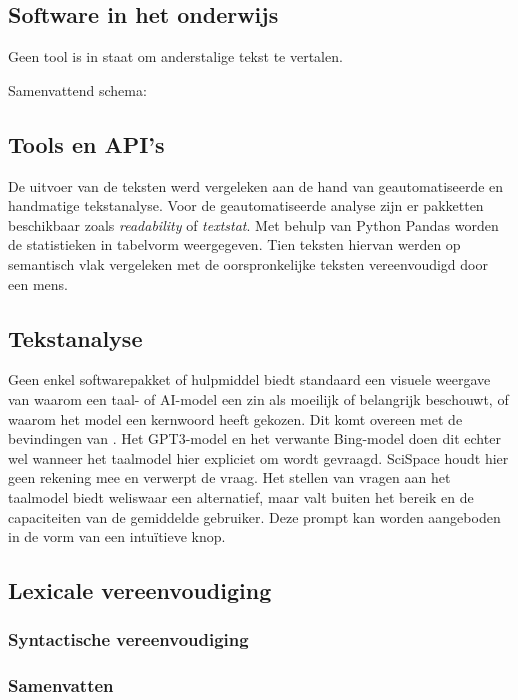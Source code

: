 \subsection{Software in het onderwijs}

Geen tool is in staat om anderstalige tekst te vertalen.

Samenvattend schema:

\subsection{Tools en API's}

De uitvoer van de teksten werd vergeleken aan de hand van geautomatiseerde en handmatige tekstanalyse. Voor de geautomatiseerde analyse zijn er pakketten beschikbaar zoals \textit{readability} of \textit{textstat}. Met behulp van Python Pandas worden de statistieken in tabelvorm weergegeven. Tien teksten hiervan werden op semantisch vlak vergeleken met de oorspronkelijke teksten vereenvoudigd door een mens.

\subsection{Tekstanalyse}

Geen enkel softwarepakket of hulpmiddel biedt standaard een visuele weergave van waarom een taal- of AI-model een zin als moeilijk of belangrijk beschouwt, of waarom het model een kernwoord heeft gekozen. Dit komt overeen met de bevindingen van \textcite{Gooding2019}. Het GPT3-model en het verwante Bing-model doen dit echter wel wanneer het taalmodel hier expliciet om wordt gevraagd. SciSpace houdt hier geen rekening mee en verwerpt de vraag. Het stellen van vragen aan het taalmodel biedt weliswaar een alternatief, maar valt buiten het bereik en de capaciteiten van de gemiddelde gebruiker. Deze prompt kan worden aangeboden in de vorm van een intuïtieve knop. 

\subsection{Lexicale vereenvoudiging}

\subsubsection{Syntactische vereenvoudiging}

\subsubsection{Samenvatten}

